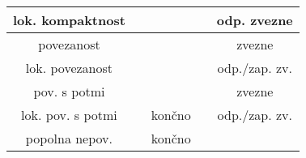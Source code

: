 \documentclass[10pt,a4paper]{article}
\newcommand{\cmark}{\checkmark}%
\newcommand{\xmark}{\ding{55}}%
\begin{document}
\begin{table}
\begin{tabular}{|c|c|c|c|c|}
        lok. kompaktnost  &       & \cmark& \xmark& odp. zvezne   \\ \hline
        povezanost        &       & \cmark& \cmark& zvezne        \\ \hline
        lok. povezanost   &       & \cmark& \cmark& odp./zap. zv.\\ \hline
        pov. s potmi      &       & \cmark& \cmark& zvezne        \\ \hline
        lok. pov. s potmi &       & končno& \cmark& odp./zap. zv. \\ \hline
        popolna nepov.    &       & končno& \xmark&               \\ \hline
    \end{tabular}
\end{table}

\end{document}
